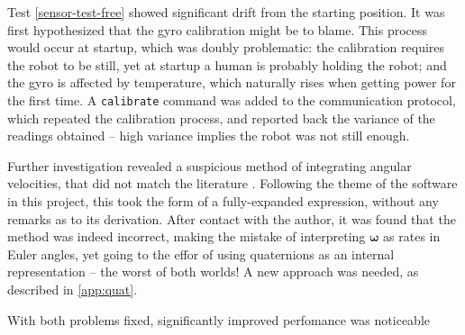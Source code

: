 \documentclass[main.tex]{subfiles}
\begin{document}
		Test \cref{sensor-test-free} showed significant drift from the starting position.
		It was first hypothesized that the gyro calibration might be to blame.
		This process would occur at startup, which was doubly problematic: the calibration requires the robot to be still, yet at startup a human is probably holding the robot; and the gyro is affected by temperature, which naturally rises when getting power for the first time.
		A \texttt{calibrate} command was added to the communication protocol, which repeated the calibration process, and reported back the variance of the readings obtained -- high variance implies the robot was not still enough.

		Further investigation revealed a suspicious method of integrating angular velocities, that did not match the literature \cite{boyle2016integration}.
		Following the theme of the software in this project, this took the form of a fully-expanded expression, without any remarks as to its derivation.
		After contact with the author, it was found that the method was indeed incorrect, making the mistake of interpreting $\bm{\omega}$ as rates in Euler angles, yet going to the effor of using quaternions as an internal representation -- the worst of both worlds! A new approach was needed, as described in \cref{app:quat}.

		With both problems fixed, significantly improved perfomance was noticeable

\bib
\end{document}
